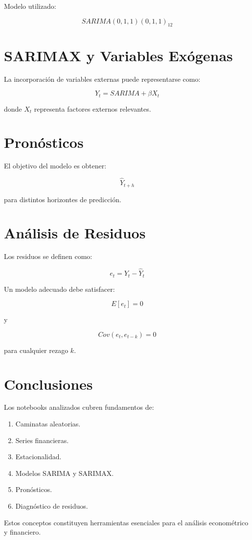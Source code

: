 \documentclass[12pt]{article}
\begin{document}
Modelo utilizado:

\begin{equation}
SARIMA(0,1,1)(0,1,1)_{12}
\end{equation}

\section{SARIMAX y Variables Exógenas}

La incorporación de variables externas puede representarse como:

\begin{equation}
Y_t = SARIMA + \beta X_t
\end{equation}

donde $X_t$ representa factores externos relevantes.

\section{Pronósticos}

El objetivo del modelo es obtener:

\begin{equation}
\hat{Y}_{t+h}
\end{equation}

para distintos horizontes de predicción.

\section{Análisis de Residuos}

Los residuos se definen como:

\begin{equation}
e_t = Y_t - \hat{Y}_t
\end{equation}

Un modelo adecuado debe satisfacer:

\begin{equation}
E[e_t] = 0
\end{equation}

y

\begin{equation}
Cov(e_t,e_{t-k}) = 0
\end{equation}

para cualquier rezago $k$.

\section{Conclusiones}

Los notebooks analizados cubren fundamentos de:

\begin{enumerate}
    \item Caminatas aleatorias.
    \item Series financieras.
    \item Estacionalidad.
    \item Modelos SARIMA y SARIMAX.
    \item Pronósticos.
    \item Diagnóstico de residuos.
\end{enumerate}

Estos conceptos constituyen herramientas esenciales para el análisis econométrico y financiero.
\end{document}
